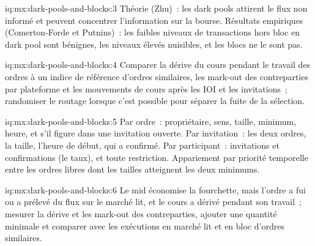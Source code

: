 \begin{solution}{iq:mx:dark-pools-and-blocks:3}
Théorie (Zhu)~: les dark pools attirent le flux non informé et peuvent concentrer l'information sur la bourse. Résultats empiriques (Comerton-Forde et Putnins)~: les faibles niveaux de
transactions hors bloc en dark pool sont bénignes, les niveaux élevés nuisibles, et les blocs ne le sont pas.
\end{solution}

\begin{solution}{iq:mx:dark-pools-and-blocks:4}
Comparer la dérive du cours pendant le travail des ordres à un indice de référence d'ordres similaires, les mark-out des contreparties par plateforme et les mouvements de cours après
les IOI et les invitations~; randomiser le routage lorsque c'est possible pour séparer la fuite de la sélection.
\end{solution}

\begin{solution}{iq:mx:dark-pools-and-blocks:5}
Par ordre~: propriétaire, sens, taille, minimum, heure, et s'il figure dans une invitation ouverte. Par invitation~: les deux ordres, la taille, l'heure de début, qui a confirmé. Par
participant~: invitations et confirmations (le taux), et toute restriction. Appariement par priorité temporelle entre les ordres libres dont les tailles atteignent les deux minimums.
\end{solution}

\begin{solution}{iq:mx:dark-pools-and-blocks:6}
Le mid économise la fourchette, mais l'ordre a fui ou a prélevé du flux sur le marché lit, et le cours a dérivé pendant son travail~; mesurer la dérive et
les mark-out des contreparties, ajouter une quantité minimale et comparer avec les exécutions en marché lit et en bloc d'ordres similaires.
\end{solution}
